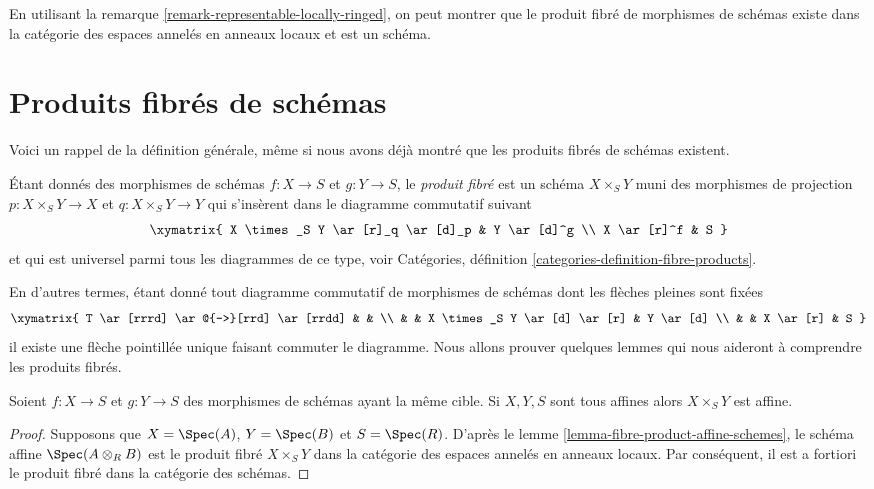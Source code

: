 \begin{remark}
\label{remark-fibre-product-schemes-locally-ringed}
En utilisant la remarque \ref{remark-representable-locally-ringed},
on peut montrer que le produit fibré de morphismes de schémas existe
dans la catégorie des espaces annelés en anneaux locaux et est un
schéma.
\end{remark}




\section{Produits fibrés de schémas}
\label{section-fibre-products}

\noindent
Voici un rappel de la définition générale, même si nous
avons déjà montré que les produits fibrés de schémas existent.

\begin{definition}
\label{definition-fibre-product}
Étant donnés des morphismes de schémas $f : X \to S$ et $g : Y
\to S$, le {\it produit fibré} est un schéma $X \times_S Y$ muni
des morphismes de projection $p : X \times_S Y \to X$
et $q : X \times_S Y \to Y$ qui s'insèrent dans le diagramme
commutatif suivant
$$
\xymatrix{
X \times_S Y \ar[r]_q \ar[d]_p & Y \ar[d]^g \\ X
\ar[r]^f & S
}
$$
et qui est universel parmi tous les diagrammes de ce
type, voir Catégories, définition \ref{categories-definition-fibre-products}.
\end{definition}

\noindent
En d'autres termes, étant donné tout diagramme commutatif de morphismes de schémas dont
les flèches pleines sont fixées
$$
\xymatrix{ T
\ar[rrrd] \ar@{-->}[rrd] \ar[rrdd] & & \\
&
&
X
\times_S
Y
\ar[d] \ar[r] & Y
\ar[d]
\\
&
&
X
\ar[r]
&
S
}
$$
il existe une flèche pointillée unique faisant commuter le diagramme.
Nous allons prouver quelques lemmes qui nous aideront à comprendre les
produits fibrés.

\begin{lemma}
\label{lemma-fibre-product-affines}
Soient $f : X \to S$ et $g : Y \to S$ des morphismes de schémas
ayant la même cible. Si $X, Y, S$ sont tous affines alors
$X \times_S Y$ est affine.
\end{lemma}

\begin{proof}
Supposons que $X = \Spec(A)$, $Y = \Spec(B)$ et $S
= \Spec(R)$. D'après le lemme \ref{lemma-fibre-product-affine-schemes}, le
schéma affine $\Spec(A \otimes_R B)$ est le produit
fibré $X \times_S Y$ dans la catégorie des espaces
annelés en anneaux locaux. Par conséquent, il est a fortiori
le produit fibré dans la catégorie des schémas.
\end{proof}

